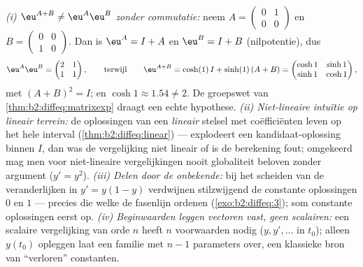 \begin{remark}
\emph{(i) $\eu^{A+B} \neq \eu^A\eu^B$ zonder commutatie:} neem $A =
\begin{pmatrix} 0 & 1\\ 0 & 0\end{pmatrix}$ en $B =
\begin{pmatrix} 0 & 0\\ 1 & 0\end{pmatrix}$. Dan is $\eu^A = I +
A$ en $\eu^B = I + B$ (nilpotentie), dus
\[
\eu^A\eu^B = \begin{pmatrix} 2 & 1\\ 1 & 1\end{pmatrix},
\qquad\text{terwijl}\qquad
\eu^{A+B} = \cosh(1)\,I + \sinh(1)\,(A + B)
= \begin{pmatrix} \cosh 1 & \sinh 1\\ \sinh 1 & \cosh 1
\end{pmatrix},
\]
met $(A+B)^2 = I$; en $\cosh 1 \approx 1.54 \neq 2$. De groepswet
van \cref{thm:b2:diffeq:matrixexp} draagt een echte hypothese.
\emph{(ii) Niet-lineaire intuïtie op lineair terrein:} de
oplossingen van een \emph{lineair} stelsel met 
coëfficiënten leven op het hele interval
(\cref{thm:b2:diffeq:linear}) --- explodeert een
kandidaat-oplossing binnen $I$, dan was de vergelijking niet
lineair of is de berekening fout; omgekeerd mag men voor
niet-lineaire vergelijkingen nooit globaliteit beloven zonder
argument ($y' = y^2$). \emph{(iii) Delen door de onbekende:} bij
het scheiden van de veranderlijken in $y' = y(1-y)$ verdwijnen
stilzwijgend de constante oplossingen $0$ en $1$ --- precies die
welke de fasenlijn ordenen (\cref{exo:b2:diffeq:3}); som constante
oplossingen eerst op. \emph{(iv) Beginwaarden leggen vectoren vast,
geen scalairen:} een scalaire vergelijking van orde $n$ heeft $n$
voorwaarden nodig ($y, y', \dots$ in $t_0$); alleen $y(t_0)$
opleggen laat een familie met $n-1$ parameters over, een klassieke
bron van ``verloren'' constanten.
\end{remark}

